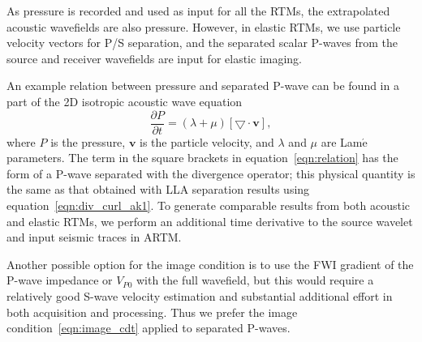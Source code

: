\documentclass[manuscript,ulem,graphix,revised]{geophysics}
\begin{document}
As pressure is recorded and used as input for all the RTMs, the extrapolated acoustic wavefields are also pressure. However, in elastic RTMs, we use particle velocity vectors for P/S separation, and the separated scalar P-waves from the source and receiver wavefields are input for elastic imaging. 

An example relation between pressure and separated P-wave can be found in a part of the 2D isotropic acoustic wave equation
\begin{equation}
\frac{\partial P}{\partial t}=(\lambda+\mu) [\bigtriangledown \cdot  \boldsymbol{v}],
\label{eqn:relation}
\end{equation}
where $P$ is the pressure, $\boldsymbol{v}$ is the particle velocity, and $\lambda$ and $\mu$ are Lam$\acute{\mathrm{e}}$ parameters. The term in the square brackets in equation~\ref{eqn:relation} has the form of a P-wave separated with the divergence operator; this physical quantity is the same as that obtained with LLA separation results using equation~\ref{eqn:div_curl_ak1}. 
To generate comparable results from both acoustic and elastic RTMs, we perform an additional time derivative to the source wavelet and input seismic traces in ARTM.\marginnote{[19]}

\marginnote{[11,12]}Another possible option for the image condition is to use the FWI gradient of the P-wave impedance or $V_{P0}$ with the full wavefield\citep{operto13,wang17}, but this would require a relatively good S-wave velocity estimation and substantial additional effort in both acquisition and processing. Thus we prefer the image condition~\ref{eqn:image_cdt} applied to separated P-waves.
\end{document}
